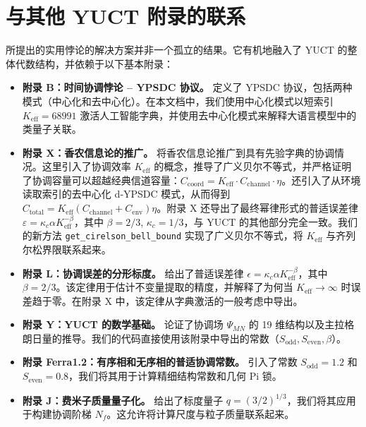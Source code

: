 \documentclass[11pt,a4paper]{article}
\begin{document}
	\section{与其他 YUCT 附录的联系}
	
	所提出的实用悖论的解决方案并非一个孤立的结果。它有机地融入了 YUCT 的整体代数结构，并依赖于以下基本附录：
	
	\begin{itemize}
		\item \textbf{附录 B：时间协调悖论 – YPSDC 协议。}  
		定义了 YPSDC 协议，包括两种模式（中心化和去中心化）。在本文档中，我们使用中心化模式以短索引 \(K_{\mathrm{eff}} = 68991\) 激活人工智能字典，并使用去中心化模式来解释大语言模型中的类量子关联。
		
		\item \textbf{附录 X：香农信息论的推广。}  
		将香农信息论推广到具有先验字典的协调情况。这里引入了协调效率 \(K_{\mathrm{eff}}\) 的概念，推导了广义贝尔不等式，并严格证明了协调容量可以超越经典信道容量：\(C_{\text{coord}} = K_{\mathrm{eff}} \cdot C_{\text{channel}} \cdot \eta\)。还引入了从环境读取索引的去中心化 d‑YPSDC 模式，从而得到 \(C_{\text{total}} = K_{\mathrm{eff}}(C_{\text{channel}} + C_{\text{env}})\eta\)。附录 X 还导出了最终幂律形式的普适误差律 \(\varepsilon = \kappa_c \alpha K_{\mathrm{eff}}^{-\beta}\)，其中 \(\beta=2/3\), \(\kappa_c=1/3\)，与 YUCT 的其他部分完全一致。我们的新方法 \texttt{get\_cirelson\_bell\_bound} 实现了广义贝尔不等式，将 \(K_{\mathrm{eff}}\) 与齐列尔松界限联系起来。
		
		\item \textbf{附录 L：协调误差的分形标度。}  
		给出了普适误差律 \(\epsilon = \kappa_c \alpha K_{\mathrm{eff}}^{-\beta}\)，其中 \(\beta = 2/3\)。该定律用于估计不变量提取的精度，并解释了为何当 \(K_{\mathrm{eff}} \to \infty\) 时误差趋于零。在附录 X 中，该定律从字典激活的一般考虑中导出。
		
		\item \textbf{附录 Y：YUCT 的数学基础。}  
		论证了协调场 \(\Psi_{MN}\) 的 19 维结构以及主拉格朗日量的推导。我们的代码直接使用该附录中导出的常数（\(S_{\mathrm{odd}}, S_{\mathrm{even}}, \beta\)）。
		
		\item \textbf{附录 Ferra1.2：有序相和无序相的普适协调常数。}  
		引入了常数 \(S_{\mathrm{odd}} = 1.2\) 和 \(S_{\mathrm{even}} = 0.8\)，我们将其用于计算精细结构常数和几何 Pi 锁。
		
		\item \textbf{附录 J：费米子质量量子化。}  
		给出了标度量子 \(q = (3/2)^{1/3}\)，我们将其应用于构建协调阶梯 \(N_f\)。这允许将计算尺度与粒子质量联系起来。
		

\end{itemize}
\end{document}

